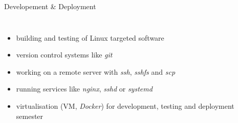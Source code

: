 \documentclass[10pt,graphics,aspectratio=169,table]{beamer}
\begin{document}
\begin{frame}{Developement \& Deployment}
\begin{columns}
        \begin{itemize}
            \item building and testing of Linux targeted software
            \item version control systems like \textit{git}
            \item working on a remote server with \textit{ssh}, \textit{sshfs} and \textit{scp}
            \item running services like \textit{nginx}, \textit{sshd} or \textit{systemd}
            \item virtualisation (VM, \textit{Docker}) for development, testing and deployment semester
        \end{itemize}

\end{columns}
\end{frame}
\end{document}
